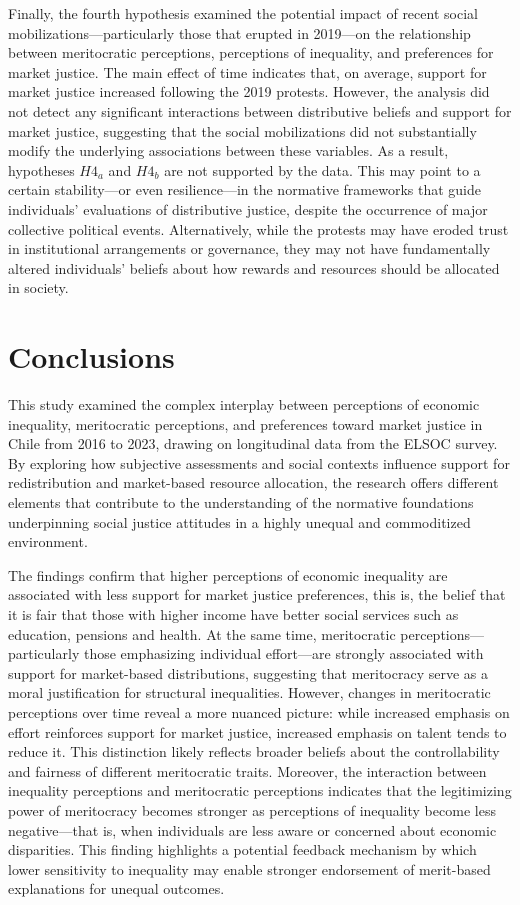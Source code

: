 \documentclass[
  12pt,
]{article}
\begin{document}
Finally, the fourth hypothesis examined the potential impact of recent
social mobilizations---particularly those that erupted in 2019---on the
relationship between meritocratic perceptions, perceptions of
inequality, and preferences for market justice. The main effect of time
indicates that, on average, support for market justice increased
following the 2019 protests. However, the analysis did not detect any
significant interactions between distributive beliefs and support for
market justice, suggesting that the social mobilizations did not
substantially modify the underlying associations between these
variables. As a result, hypotheses \(H4_{a}\) and \(H4_{b}\) are not
supported by the data. This may point to a certain stability---or even
resilience---in the normative frameworks that guide individuals'
evaluations of distributive justice, despite the occurrence of major
collective political events. Alternatively, while the protests may have
eroded trust in institutional arrangements or governance, they may not
have fundamentally altered individuals' beliefs about how rewards and
resources should be allocated in society.

\section{Conclusions}\label{conclusions}

This study examined the complex interplay between perceptions of
economic inequality, meritocratic perceptions, and preferences toward
market justice in Chile from 2016 to 2023, drawing on longitudinal data
from the ELSOC survey. By exploring how subjective assessments and
social contexts influence support for redistribution and market-based
resource allocation, the research offers different elements that
contribute to the understanding of the normative foundations
underpinning social justice attitudes in a highly unequal and
commoditized environment.

The findings confirm that higher perceptions of economic inequality are
associated with less support for market justice preferences, this is,
the belief that it is fair that those with higher income have better
social services such as education, pensions and health. At the same
time, meritocratic perceptions---particularly those emphasizing
individual effort---are strongly associated with support for
market-based distributions, suggesting that meritocracy serve as a moral
justification for structural inequalities. However, changes in
meritocratic perceptions over time reveal a more nuanced picture: while
increased emphasis on effort reinforces support for market justice,
increased emphasis on talent tends to reduce it. This distinction likely
reflects broader beliefs about the controllability and fairness of
different meritocratic traits. Moreover, the interaction between
inequality perceptions and meritocratic perceptions indicates that the
legitimizing power of meritocracy becomes stronger as perceptions of
inequality become less negative---that is, when individuals are less
aware or concerned about economic disparities. This finding highlights a
potential feedback mechanism by which lower sensitivity to inequality
may enable stronger endorsement of merit-based explanations for unequal
outcomes.
\end{document}
